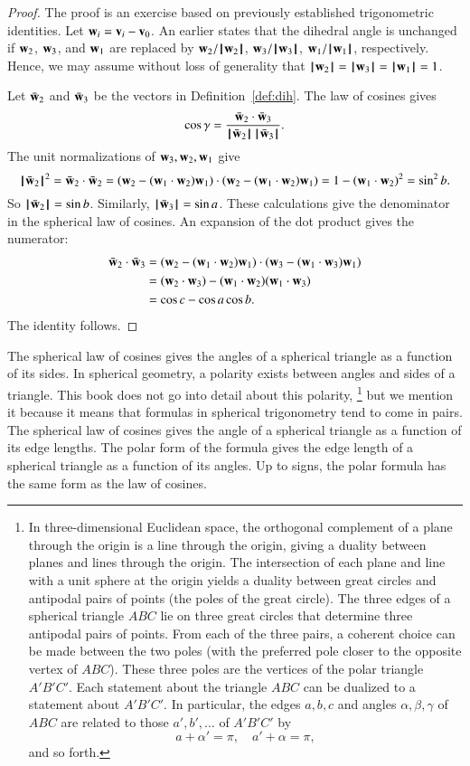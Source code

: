 \begin{proof} The proof is an exercise based on previously established
  trigonometric identities.  Let ${\mathbf w}_i = {\mathbf v}_i-{\mathbf v}_0$.  An earlier
   states that the dihedral angle is
  unchanged if ${\mathbf w}_2$, ${\mathbf w}_3$, and ${\mathbf w}_1$ are replaced by
  ${\mathbf w}_2/{{\hskip0.1em|\hskip-0.15em|\hskip0.1em}{\mathbf w}_2{\hskip0.1em|\hskip-0.15em|\hskip0.1em}}$, ${\mathbf w}_3/{{\hskip0.1em|\hskip-0.15em|\hskip0.1em}{\mathbf w}_3{\hskip0.1em|\hskip-0.15em|\hskip0.1em}}$, ${\mathbf w}_1/{{\hskip0.1em|\hskip-0.15em|\hskip0.1em}{\mathbf w}_1{\hskip0.1em|\hskip-0.15em|\hskip0.1em}}$,
  respectively.  Hence, we may assume without loss of generality that
  ${{\hskip0.1em|\hskip-0.15em|\hskip0.1em}{\mathbf w}_2{\hskip0.1em|\hskip-0.15em|\hskip0.1em}}={{\hskip0.1em|\hskip-0.15em|\hskip0.1em}{\mathbf w}_3{\hskip0.1em|\hskip-0.15em|\hskip0.1em}}={{\hskip0.1em|\hskip-0.15em|\hskip0.1em}{\mathbf w}_1{\hskip0.1em|\hskip-0.15em|\hskip0.1em}}=1$.

Let $\bar {{\mathbf w}}_2$ and $\bar {{\mathbf w}}_3$ be the vectors in Definition~\ref{def:dih}.
The law of cosines gives
\[ \cos\gamma = \frac{\bar {{\mathbf w}}_2\cdot \bar {{\mathbf w}}_3}
{{{\hskip0.1em|\hskip-0.15em|\hskip0.1em}\bar {{\mathbf w}}_2{\hskip0.1em|\hskip-0.15em|\hskip0.1em}}\,{{\hskip0.1em|\hskip-0.15em|\hskip0.1em}\bar {{\mathbf w}}_3{\hskip0.1em|\hskip-0.15em|\hskip0.1em}}}.
\] 
The unit normalizations of ${\mathbf w}_3,{\mathbf w}_2,{\mathbf w}_1$ give
\[ 
{{\hskip0.1em|\hskip-0.15em|\hskip0.1em}\bar {{\mathbf w}}_2{\hskip0.1em|\hskip-0.15em|\hskip0.1em}}^2 = \bar {{\mathbf w}}_2\cdot \bar {{\mathbf w}}_2 =
({\mathbf w}_2 - ({\mathbf w}_1\cdot {\mathbf w}_2){\mathbf w}_1)\cdot ({\mathbf w}_2 - ({\mathbf w}_1\cdot {\mathbf w}_2) {\mathbf w}_1) =
1 - ({\mathbf w}_1\cdot {\mathbf w}_2)^2 = \sin^2 b.
\] 
So ${{\hskip0.1em|\hskip-0.15em|\hskip0.1em}\bar {{\mathbf w}}_2{\hskip0.1em|\hskip-0.15em|\hskip0.1em}} =\sin b$. Similarly, ${{\hskip0.1em|\hskip-0.15em|\hskip0.1em}\bar {{\mathbf w}}_3{\hskip0.1em|\hskip-0.15em|\hskip0.1em}} = \sin a$.
These calculations give the denominator in the spherical law of cosines.  An
expansion of the dot product gives the numerator:
\begin{align*}
\bar {{\mathbf w}}_2\cdot \bar {{\mathbf w}}_3 &=
 ({\mathbf w}_2 - ({\mathbf w}_1\cdot {\mathbf w}_2) {\mathbf w}_1)\cdot ({\mathbf w}_3 - ({\mathbf w}_1\cdot {\mathbf w}_3) {\mathbf w}_1)\\
&= ({\mathbf w}_2\cdot {\mathbf w}_3) - ({\mathbf w}_1\cdot {\mathbf w}_2) ({\mathbf w}_1\cdot {\mathbf w}_3) \\
&= \cos c - \cos a \cos b.
\end{align*}
The identity follows.
\end{proof}

The spherical law of cosines gives the angles of a spherical triangle
as a function of its sides.  In spherical geometry, a
polarity exists between angles and sides of a triangle.  This book does not
go into detail about this polarity,%
%
\footnote{In three-dimensional Euclidean space, the orthogonal
  complement of a plane through the origin is a line through the
  origin, giving a duality between planes and lines through the
  origin.  The intersection of each plane and line with a unit sphere
  at the origin yields a duality between great circles and antipodal
  pairs of points (the poles of the great circle).  The three edges of
  a spherical triangle $ABC$ lie on three great circles that
  determine three antipodal pairs of points.  From each of the three
  pairs, a coherent choice can be made between the two poles (with the preferred pole closer to the opposite vertex of $ABC$).  These
  three poles are the vertices of the polar triangle $A'B'C'$.  Each
  statement about the triangle $ABC$ can be dualized to a statement
  about $A'B'C'$.  In particular, the edges $a,b,c$ and angles
  $\alpha,\beta,\gamma$ of $ABC$ are related to those $a',b',\ldots$
  of $A'B'C'$ by
\[ 
a + \alpha' = \pi,\quad a' + \alpha= \pi,
\] 
and so forth.
}  %
%
%
 but we mention it because it means that formulas in spherical
trigonometry tend to come in pairs.  The spherical law of cosines
gives the angle of a spherical triangle as a function of its edge
lengths.  The polar form of the formula gives the
edge length of a spherical triangle as a function of its angles.
Up to signs,
the polar formula has the same form as the law of cosines.
%

